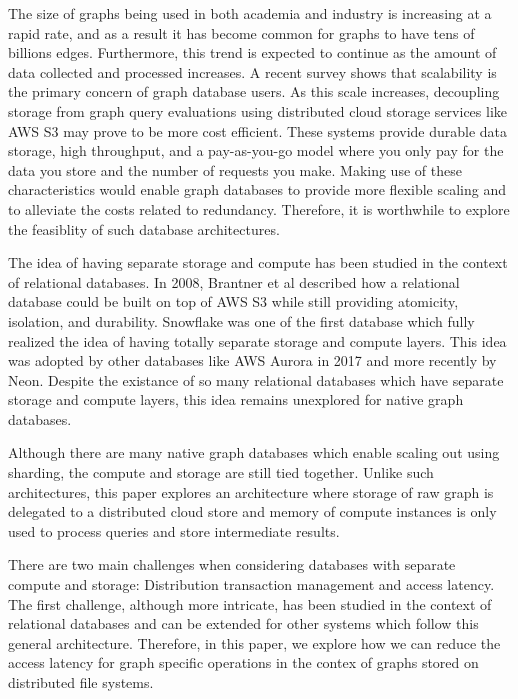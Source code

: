 The size of graphs being used in both academia and industry is increasing at a
rapid rate, and as a result it has become common for graphs to have tens of
billions edges\cite{sahu2017ubiquity}. Furthermore, this trend is expected to
continue as the amount of data collected and processed increases. A recent
survey shows that scalability is the primary concern of graph database
users\cite{sahu2017ubiquity}. As this scale
increases, decoupling storage from graph query evaluations using distributed
cloud storage services like AWS S3\cite{awsS3} may prove to be
more cost efficient. These systems provide durable data storage, high
throughput, and a pay-as-you-go model where you only pay for the data you store
and the number of requests you make. Making use of these characteristics would
enable graph databases to provide more flexible scaling and to alleviate 
the costs related to redundancy. Therefore, it is worthwhile to explore
the feasiblity of such database architectures.

\medskip
The idea of having separate storage and compute has been studied in the context
of relational databases. In 2008, Brantner et al\cite{brantner2008building}
described how a relational database could be built on top of AWS S3 while still
providing atomicity, isolation, and durability. Snowflake\cite{snowflake} was
one of the first database which fully realized the idea of having totally
separate storage and compute layers. This idea was adopted by other databases
like AWS Aurora\cite{verbitski2017amazon} in 2017 and more recently by
Neon\cite{neonPostgres}. Despite the existance of so many relational databases
which have separate storage and compute layers, this idea remains unexplored for
native graph databases.

\medskip
Although there are many native graph databases which enable scaling out
using sharding\cite{besta2023demystifying}, the compute and storage are
still tied together. Unlike such architectures, this paper explores an
architecture where storage of raw graph is delegated to a distributed cloud
store and memory of compute instances is only used to process queries and store
intermediate results.

\medskip
There are two main challenges when considering databases with separate compute
and storage: Distribution transaction management and access latency. The first
challenge, although more intricate, has been studied in the context of
relational databases\cite{brantner2008building} and can be extended for other
systems which follow this general architecture. Therefore, in this paper, we
explore how we can reduce the access latency for graph specific operations in
the contex of graphs stored on distributed file systems.

